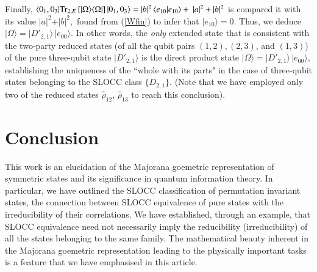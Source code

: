 {Finally,   
$\langle 0_1,0_3\vert{\rm Tr}_{2,E}\, [\vert\Omega\rangle\langle\Omega\vert]\, \vert 0_1,0_3\rangle=\vert %
b\vert^2\, \langle e_{10}\vert e_{10}\rangle+ \ \vert a\vert^2 +\vert b\vert^2$  
is  compared it with its value $\vert a\vert^2+\vert b\vert^2,$  found  from (\ref{Wfin}) to infer that  $\vert %
e_{10}\rangle=0$. 
Thus, we deduce
$\vert\Omega\rangle=\vert D'_{2,1}\rangle\, \vert e_{00}\rangle.$
In other words, the {\em only} extended state  that is consistent 
with the two-party reduced states (of all the qubit pairs $(1,2), (2,3)$, 
and $(1,3)$)  of the pure three-qubit state $\vert D'_{2,1}\rangle$ is the direct product state  
$\vert\Omega\rangle=\vert D'_{2,1}\rangle\, \vert e_{00}\rangle$,  establishing  the uniqueness of the ``whole 
with its parts" in the case of three-qubit states belonging to the SLOCC class $\{D_{2,1}\}$. (Note that we have  
employed only two  of the reduced states $\hat{\rho}_{12}$, $\hat{\rho}_{13}$ to reach this conclusion).         






\section{Conclusion}
This work is an elucidation of the Majorana goemetric representation of symmetric states and its significance in quantum information theory. In particular, we have outlined the SLOCC classification of permutation invariant states, the connection between SLOCC equivalence of pure states with the 
irreducibility \cite{SP1,SP2,SP2b} of their correlations. We have established, through an example, that SLOCC equivalence need not necessarily imply 
the reducibility (irreducibility) of all the states belonging to the same family. The  mathematical beauty inherent in the Majorana goemetric representation leading to the physically important tasks is a feature that we have emphasised in this article. 

 

}
